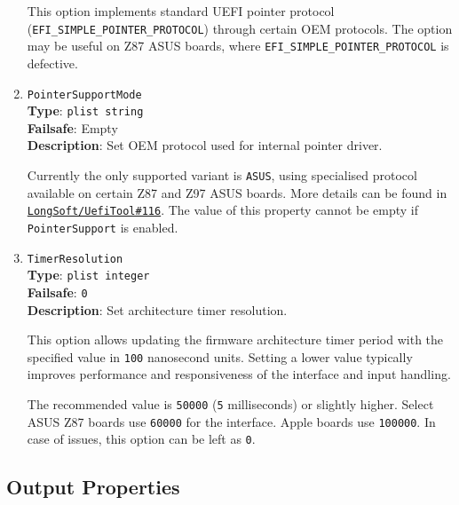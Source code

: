 \documentclass[]{article}
\begin{document}
\begin{enumerate}
  This option implements standard UEFI pointer protocol (\texttt{EFI\_SIMPLE\_POINTER\_PROTOCOL})
  through certain OEM protocols. The option may be useful on Z87 ASUS boards, where
  \texttt{EFI\_SIMPLE\_POINTER\_PROTOCOL} is defective.

\item
  \texttt{PointerSupportMode}\\
  \textbf{Type}: \texttt{plist\ string}\\
  \textbf{Failsafe}: Empty\\
  \textbf{Description}: Set OEM protocol used for internal pointer driver.

  Currently the only supported variant is \texttt{ASUS}, using specialised protocol available
  on certain Z87 and Z97 ASUS boards. More details can be found in
  \href{https://github.com/LongSoft/UEFITool/pull/116}{\texttt{LongSoft/UefiTool\#116}}.
  The value of this property cannot be empty if \texttt{PointerSupport} is enabled.

\item
  \texttt{TimerResolution}\\
  \textbf{Type}: \texttt{plist\ integer}\\
  \textbf{Failsafe}: \texttt{0}\\
  \textbf{Description}: Set architecture timer resolution.

  This option allows updating the firmware architecture timer period with the specified value
  in \texttt{100} nanosecond units. Setting a lower value typically improves performance
  and responsiveness of the interface and input handling.

  The recommended value is \texttt{50000} (\texttt{5} milliseconds) or slightly higher. Select
  ASUS Z87 boards use \texttt{60000} for the interface. Apple boards use \texttt{100000}.
  In case of issues, this option can be left as \texttt{0}.

\end{enumerate}

\subsection{Output Properties}\label{uefioutputprops}
\end{document}
